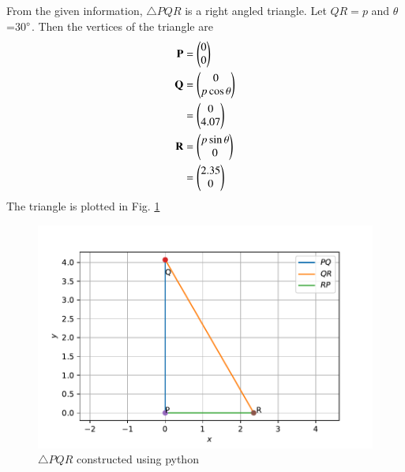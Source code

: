 From the given information, 
 $\triangle PQR$ is a right angled triangle. Let $QR=p$ and $\theta$=30$\degree$.
Then the vertices of the triangle are
\begin{align}
\mathbf{P} &= \begin{pmatrix}0\\0\end{pmatrix} \\
\mathbf{Q} &= \begin{pmatrix}0 \\ p \cos \theta \end{pmatrix} \\
	&= \begin{pmatrix}0 \\ 4.07\end{pmatrix} \\
\mathbf{R} &= \begin{pmatrix}p \sin \theta \\ 0\end{pmatrix}\\
	&= \begin{pmatrix}2.35 \\ 0\end{pmatrix}
\end{align}
The triangle is plotted in Fig. \ref{constr/tri/27/2/fig}
%
\begin{figure}[ht]
  \centering
    \includegraphics[width= \columnwidth]{solutions/triangle/27/2/triangle1.pdf}
    \caption{$\triangle PQR$ constructed using python}
    \label{constr/tri/27/2/fig}
\end{figure}

